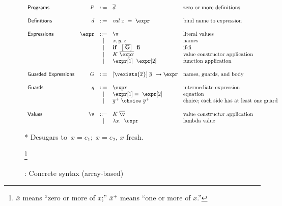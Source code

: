 \documentclass[runningheads]{llncs}
\begin{document}
    \begin{figure}[t]
      \scriptsize
          \begin{center}
            \[
            \begin{array}{lrcll}
            \textsf{Programs} & P & ::= & \overline{d} & \text{zero or more definitions} \\
            \\
            \textsf{Definitions} & d & ::= & \it{val}\; x\;~\it{=}\;~\expr & \text{bind name to expression} \\
            \\
            \textsf{Expressions} & \expr & ::= & \v & \text{literal values} \\
            & & | & x, y, z & \text{names} \\
            & & | & \bf{if}\;~\left[\; \overline{G}\right]\;~\bf{fi} & \text{if-fi} \\
            & & | & K~\overline{\expr} & \text{value constructor application} \\
            & & | & \expr[1]\;~\expr[2] & \text{function application} \\
            \\
            \textsf{Guarded Expressions} & G & ::= & [\vexists{\overline{x}}]~\overline{g}~\boldsymbol{\rightarrow}\expr & \text{names, guards, and body} \\
            \\
            \textsf{Guards} & g & ::= & \expr & \text{intermediate expression} \\
            & & | & \expr[1] =~\expr[2] & \text{equation} \\
            & & | & \overline{g}^{+}~\choice~\overline{g}^{+} & \text{choice; each side has at least one guard} \\
            \\
            \textsf{Values} & \v & ::= & K\;\overline{\v} & \text{value constructor application} \\
            & & | & \lambda x.\;~\expr & \text{lambda value}
            \end{array}
            \]
            \medskip

          * Desugars to~{$x = e_{1};\; x = e_{2}$}, $x$ fresh. %
          \end{center}
          \caption{\VMinus: Concrete syntax (array-based)}\footnote{$\overline{x}$ means ``zero or more of $x$;''
          $\overline{x}^{+}$ means ``one or more of $x$.''}
          \label{fig:vmsyntax-array}
        \end{figure}
\end{document}
